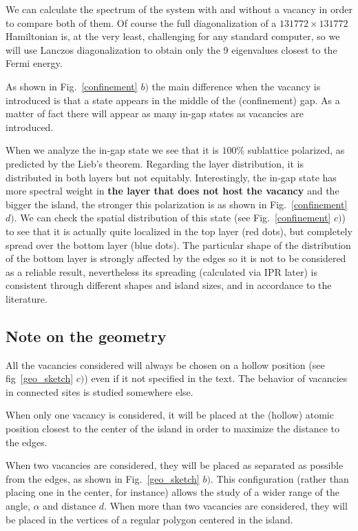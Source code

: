 We can calculate the spectrum of the system with and without a vacancy in order to compare both of them. Of course the full diagonalization of a $131772\times131772$ Hamiltonian is, at the very least, challenging for any standard computer, so we will use Lanczos diagonalization\cite{Lanczos1950, Ojalvo1970, Arnoldi1951} to obtain only the 9 eigenvalues closest to the Fermi energy.

As shown in Fig.~\ref{confinement} $b)$ the main difference when the vacancy is introduced is that a state appears in the middle of the (confinement) gap. As a matter of fact there will appear as many in-gap states as vacancies are introduced.

When we analyze the in-gap state we see that it is $100\%$ sublattice polarized, as predicted by the Lieb's theorem\cite{Lieb1989}. Regarding the layer distribution, it is distributed in both layers but not equitably. Interestingly, the in-gap state has more spectral weight in \textbf{the layer that does not host the vacancy} and the bigger the island, the stronger this polarization is as shown in Fig.~\ref{confinement} $d)$.
We can check the spatial distribution of this state (see Fig.~\ref{confinement} $c)$) to see that it is actually quite localized in the top layer (red dots), but completely spread over the bottom layer (blue dots). The particular shape of the distribution of the bottom layer is strongly affected by the edges so it is not to be considered as a reliable result, nevertheless its spreading (calculated via IPR later) is consistent through different shapes and island sizes, and in accordance to the literature\cite{Castro2010}.


\subsection{Note on the geometry}
All the vacancies considered will always be chosen on a hollow position (see fig~\ref{geo_sketch} $c)$) even if it not specified in the text. The behavior of vacancies in connected sites is studied somewhere else\cite{Castro2010}.

When only one vacancy is considered, it will be placed at the (hollow) atomic position closest to the center of the island in order to maximize the distance to the edges.

When two vacancies are considered, they will be placed as separated as possible from the edges, as shown in Fig.~\ref{geo_sketch} $b)$. This configuration (rather than placing one in the center, for instance) allows the study of a wider range of the angle, $\alpha$ and distance $d$.
When more than two vacancies are considered, they will be placed in the vertices of a regular polygon centered in the island.

